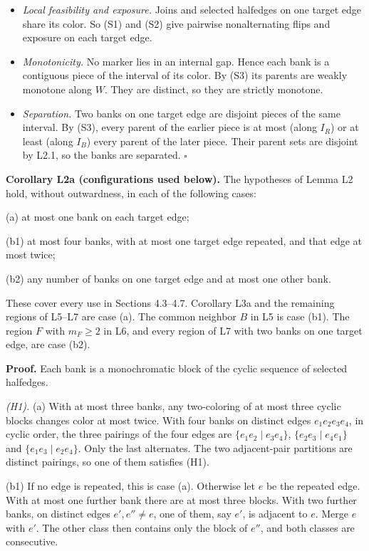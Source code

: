 \documentclass[
  11pt,
]{article}
\providecommand{\tightlist}{%
  \setlength{\itemsep}{0pt}\setlength{\parskip}{0pt}}
\begin{document}
\begin{itemize}
\tightlist
\item
  \emph{Local feasibility and exposure.} Joins and selected halfedges on
  one target edge share its color. So (S1) and (S2) give pairwise
  nonalternating flips and exposure on each target edge.
\item
  \emph{Monotonicity.} No marker lies in an internal gap. Hence each
  bank is a contiguous piece of the interval of its color. By (S3) its
  parents are weakly monotone along \(W\). They are distinct, so they
  are strictly monotone.
\item
  \emph{Separation.} Two banks on one target edge are disjoint pieces of
  the same interval. By (S3), every parent of the earlier piece is at
  most (along \(I_R\)) or at least (along \(I_B\)) every parent of the
  later piece. Their parent sets are disjoint by L2.1, so the banks are
  separated. \(\square\)
\end{itemize}

\textbf{Corollary L2a (configurations used below).} The hypotheses of
Lemma L2 hold, without outwardness, in each of the following cases:

(a) at most one bank on each target edge;

(b1) at most four banks, with at most one target edge repeated, and that
edge at most twice;

(b2) any number of banks on one target edge and at most one other bank.

These cover every use in Sections 4.3--4.7. Corollary L3a and the
remaining regions of L5--L7 are case (a). The common neighbor \(B\) in
L5 is case (b1). The region \(F\) with \(m_F\ge2\) in L6, and every
region of L7 with two banks on one target edge, are case (b2).

\textbf{Proof.} Each bank is a monochromatic block of the cyclic
sequence of selected halfedges.

\emph{(H1).} (a) With at most three banks, any two-coloring of at most
three cyclic blocks changes color at most twice. With four banks on
distinct edges \(e_1e_2e_3e_4\), in cyclic order, the three pairings of
the four edges are \(\{e_1e_2\mid e_3e_4\}\), \(\{e_2e_3\mid e_4e_1\}\)
and \(\{e_1e_3\mid e_2e_4\}\). Only the last alternates. The two
adjacent-pair partitions are distinct pairings, so one of them satisfies
(H1).

(b1) If no edge is repeated, this is case (a). Otherwise let \(e\) be
the repeated edge. With at most one further bank there are at most three
blocks. With two further banks, on distinct edges \(e',e''\ne e\), one
of them, say \(e'\), is adjacent to \(e\). Merge \(e\) with \(e'\). The
other class then contains only the block of \(e''\), and both classes
are consecutive.
\end{document}
